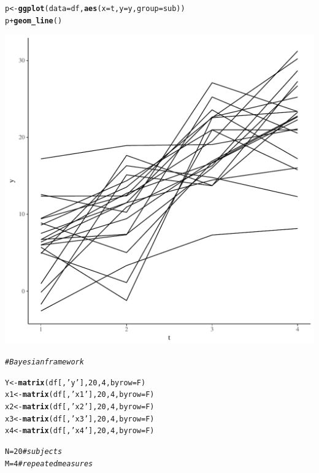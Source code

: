 \documentclass[11pt,a4paper,twoside]{book}\usepackage[]{graphicx}\usepackage[]{color}
\makeatletter
\def\maxwidth{ %
  \ifdim\Gin@nat@width>\linewidth
    \linewidth
  \else
    \Gin@nat@width
  \fi
}
\newcommand{\hlnum}[1]{\textcolor[rgb]{0.686,0.059,0.569}{#1}}%
\newcommand{\hlstr}[1]{\textcolor[rgb]{0.192,0.494,0.8}{#1}}%
\newcommand{\hlcom}[1]{\textcolor[rgb]{0.678,0.584,0.686}{\textit{#1}}}%
\newcommand{\hlopt}[1]{\textcolor[rgb]{0,0,0}{#1}}%
\newcommand{\hlstd}[1]{\textcolor[rgb]{0.345,0.345,0.345}{#1}}%
\newcommand{\hlkwb}[1]{\textcolor[rgb]{0.69,0.353,0.396}{#1}}%
\newcommand{\hlkwc}[1]{\textcolor[rgb]{0.333,0.667,0.333}{#1}}%
\newcommand{\hlkwd}[1]{\textcolor[rgb]{0.737,0.353,0.396}{\textbf{#1}}}%
\newenvironment{kframe}{%
 \def\at@end@of@kframe{}%
 \ifinner\ifhmode%
  \def\at@end@of@kframe{\end{minipage}}%
  \begin{minipage}{\columnwidth}%
 \fi\fi%
 \def\FrameCommand##1{\hskip\@totalleftmargin \hskip-\fboxsep
 \colorbox{shadecolor}{##1}\hskip-\fboxsep
     \hskip-\linewidth \hskip-\@totalleftmargin \hskip\columnwidth}%
 \MakeFramed {\advance\hsize-\width
   \@totalleftmargin\z@ \linewidth\hsize
   \@setminipage}}%
 {\par\unskip\endMakeFramed%
 \at@end@of@kframe}
\newenvironment{knitrout}{}{} %
\makeatother
\begin{document}
\begin{knitrout}
\begin{kframe}
\begin{alltt}
\hlstd{p} \hlkwb{<-} \hlkwd{ggplot}\hlstd{(}\hlkwc{data} \hlstd{= df,} \hlkwd{aes}\hlstd{(}\hlkwc{x} \hlstd{= t,} \hlkwc{y} \hlstd{= y,} \hlkwc{group} \hlstd{= sub))}
\hlstd{p} \hlopt{+} \hlkwd{geom_line}\hlstd{()}
\end{alltt}
\end{kframe}
\includegraphics[width=\maxwidth]{figure/ch04_figsimdata_repeated_unstruct-1} 
\begin{kframe}\begin{alltt}
\hlcom{# Bayesian framework}

\hlstd{Y} \hlkwb{<-} \hlkwd{matrix}\hlstd{(df[,}\hlstr{'y'}\hlstd{],} \hlnum{20}\hlstd{,} \hlnum{4}\hlstd{,} \hlkwc{byrow}\hlstd{=F)}
\hlstd{x1} \hlkwb{<-} \hlkwd{matrix}\hlstd{(df[,}\hlstr{'x1'}\hlstd{],} \hlnum{20}\hlstd{,} \hlnum{4}\hlstd{,} \hlkwc{byrow}\hlstd{=F)}
\hlstd{x2} \hlkwb{<-} \hlkwd{matrix}\hlstd{(df[,}\hlstr{'x2'}\hlstd{],} \hlnum{20}\hlstd{,} \hlnum{4}\hlstd{,} \hlkwc{byrow}\hlstd{=F)}
\hlstd{x3} \hlkwb{<-} \hlkwd{matrix}\hlstd{(df[,}\hlstr{'x3'}\hlstd{],} \hlnum{20}\hlstd{,} \hlnum{4}\hlstd{,} \hlkwc{byrow}\hlstd{=F)}
\hlstd{x4} \hlkwb{<-} \hlkwd{matrix}\hlstd{(df[,}\hlstr{'x4'}\hlstd{],} \hlnum{20}\hlstd{,} \hlnum{4}\hlstd{,} \hlkwc{byrow}\hlstd{=F)}

\hlstd{N} \hlkwb{=} \hlnum{20} \hlcom{#subjects}
\hlstd{M} \hlkwb{=} \hlnum{4} \hlcom{# repeated measures}
\end{alltt}
\end{kframe}
\end{knitrout}
\end{document}
